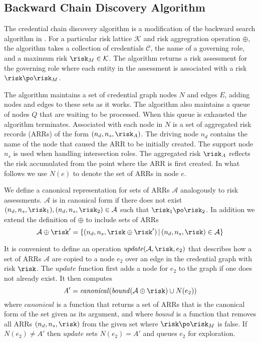 \subsection{Backward Chain Discovery Algorithm}

The credential chain discovery algorithm is a modification of the backward search algorithm in
\cite{Li:2003-02}. For a particular risk lattice $\mathcal{K}$ and risk aggregration operation
$\oplus$, the algorithm takes a collection of credentials $\mathcal{C}$, the name of a governing
role, and a maximum risk $\risk_M \in \mathcal{K}$. The algorithm returns a risk assessment for
the governing role where each entity in the assessment is associated with a risk $\risk \po
\risk_M$.

The algorithm maintains a set of credential graph nodes $N$ and edges $E$, adding nodes and
edges to these sets as it works. The algorithm also maintains a queue of nodes $Q$ that are
waiting to be processed. When this queue is exhausted the algorithm terminates. Associated with
each node in $N$ is a set of aggregated risk records (ARRs) of the form $(n_d, n_s, \risk_A)$.
The driving node $n_d$ contains the name of the node that caused the ARR to be initially
created. The support node $n_s$ is used when handling intersection roles. The aggregated risk
$\risk_A$ reflects the risk accumulated from the point where the ARR is first created. In what
follows we use $N(e)$ to denote the set of ARRs in node $e$.

We define a canonical representation for sets of ARRs $\mathcal{A}$ analogously to risk
assessments. $\mathcal{A}$ is in canonical form if there does not exist $(n_d, n_s, \risk_1),
(n_d, n_s, \risk_2) \in \mathcal{A}$ such that $\risk_1 \po \risk_2$. In addition we extend the
definition of $\oplus$ to include sets of ARRs
$$
\mathcal{A} \oplus \risk' = \{(n_d, n_s, \risk \oplus \risk')\,|\, (n_d, n_s, \risk) \in
\mathcal{A}\}
$$

It is convenient to define an operation $\mathit{update}(\mathcal{A}, \risk, e_2)$ that
describes how a set of ARRs $\mathcal{A}$ are copied to a node $e_2$ over an edge in the
credential graph with risk $\risk$. The $\mathit{update}$ function first adds a node for $e_2$
to the graph if one does not already exist. It then computes
$$
A' = \mathit{canonical}(\mathit{bound}(\mathcal{A} \oplus \risk) \cup N(e_2))
$$
where $\mathit{canonical}$ is a function that returns a set of ARRs that is the canonical form
of the set given as its argument, and where $\mathit{bound}$ is a function that removes all ARRs
$(n_d, n_s, \risk)$ from the given set where $\risk \po \risk_M$ is false. If $N(e_2) \ne A'$
then $\mathit{update}$ sets $N(e_2) = A'$ and queues $e_2$ for exploration.

